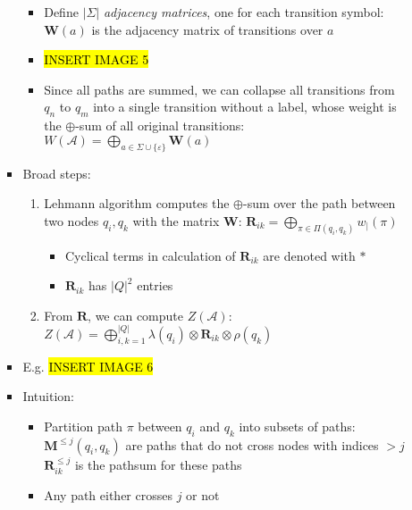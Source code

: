 \begin{itemize}
\begin{itemize}
\begin{itemize}
            \begin{itemize}
                \item Define $|\Sigma|$ \emph{adjacency matrices}, one for each transition symbol: $\boldsymbol{W}(a)$ is the adjacency matrix of transitions over $a$
                \item \hl{INSERT IMAGE 5}
                \item Since all paths are summed, we can collapse all transitions from $q_n$ to $q_m$ into a single transition without a label, whose weight is the $\oplus$-sum of all original transitions:
                $
                W(\mathcal{A}) = \bigoplus_{a \in \Sigma \cup \{\varepsilon\}} \boldsymbol{W}(a)
                $
            \end{itemize}
            \item Broad steps:
            \begin{enumerate}
                \item Lehmann algorithm computes the $\oplus$-sum over the path between two nodes $q_i, q_k$ with the matrix $\boldsymbol{W}$:
                $
                \boldsymbol{R}_{ik} = \bigoplus_{\pi \in \Pi(q_i, q_k)} w_\mid(\pi)
                $
                \begin{itemize}
                    \item Cyclical terms in calculation of $\boldsymbol{R}_{ik}$ are denoted with $*$
                    \item $\boldsymbol{R}_{ik}$ has $|Q|^2$ entries
                \end{itemize}
                \item From $\boldsymbol{R}$, we can compute $Z(\mathcal{A})$:
                $
                Z(\mathcal{A}) = \bigoplus_{i,k=1}^{|Q|} \lambda(q_i) \otimes \boldsymbol{R}_{ik} \otimes \rho(q_k)
                $
            \end{enumerate}
            \item E.g.
            \hl{INSERT IMAGE 6}
            \item Intuition:
            \begin{itemize}
                \item Partition path $\pi$ between $q_i$ and $q_k$ into subsets of paths:
                $\boldsymbol{M}^{\leq j}(q_i, q_k)$ are paths that do not cross nodes with indices $> j$\\
                $\boldsymbol{R}_{ik}^{\leq j}$ is the pathsum for these paths
                \item Any path either crosses $j$ or not

\end{itemize}
\end{itemize}
\end{itemize}
\end{itemize}
